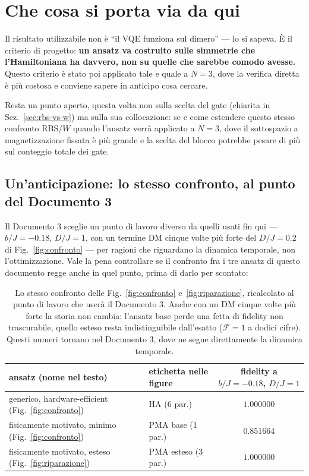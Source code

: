 \documentclass[11pt,a4paper]{article}
\begin{document}
\section{Che cosa si porta via da qui}

Il risultato utilizzabile non è ``il VQE funziona sul dimero'' --- lo si sapeva.
È il criterio di progetto: \textbf{un ansatz va costruito sulle simmetrie che
l'Hamiltoniana ha davvero, non su quelle che sarebbe comodo avesse.} Questo
criterio è stato poi applicato tale e quale a $N=3$, dove la verifica diretta è
più costosa e conviene sapere in anticipo cosa cercare.

Resta un punto aperto, questa volta non sulla scelta del gate (chiarita in
Sez.~\ref{sec:rbs-vs-w}) ma sulla sua collocazione: se e come estendere questo
stesso confronto RBS/$W$ quando l'ansatz verrà applicato a $N=3$, dove il
sottospazio a magnetizzazione fissata è più grande e la scelta del blocco
potrebbe pesare di più sul conteggio totale dei gate.

\subsection*{Un'anticipazione: lo stesso confronto, al punto del Documento 3}

Il Documento 3 sceglie un punto di lavoro diverso da quelli usati fin qui ---
$b/J=-0.18$, $D/J=1$, con un termine DM cinque volte più forte del $D/J=0.2$
di Fig.~\ref{fig:confronto} --- per ragioni che riguardano la dinamica
temporale, non l'ottimizzazione. Vale la pena controllare se il confronto fra
i tre ansatz di questo documento regge anche in quel punto, prima di darlo per
scontato:

\begin{table}[htbp]
\centering
\small
\renewcommand{\arraystretch}{1.3}
\begin{tabular}{@{}llc@{}}
\toprule
\rowcolor{grigetto}
\textbf{ansatz (nome nel testo)} & \textbf{etichetta nelle figure} & \textbf{fidelity a $b/J=-0.18$, $D/J=1$} \\
\midrule
generico, hardware-efficient (Fig.~\ref{fig:confronto}) & HA (6 par.) & $1.000000$ \\
fisicamente motivato, minimo (Fig.~\ref{fig:confronto}) & PMA base (1 par.) & $0.851664$ \\
fisicamente motivato, esteso (Fig.~\ref{fig:riparazione}) & PMA esteso (3 par.) & $1.000000$ \\
\bottomrule
\end{tabular}
\caption{Lo stesso confronto delle Fig.~\ref{fig:confronto}
e~\ref{fig:riparazione}, ricalcolato al punto di lavoro che userà il
Documento 3. Anche con un DM cinque volte più forte la storia non cambia:
l'ansatz base perde una fetta di fidelity non trascurabile, quello esteso
resta indistinguibile dall'esatto ($\mathcal F=1$ a dodici cifre). Questi
numeri tornano nel Documento 3, dove ne segue direttamente la dinamica
temporale.}
\label{tab:preview-doc3}
\end{table}
\end{document}
